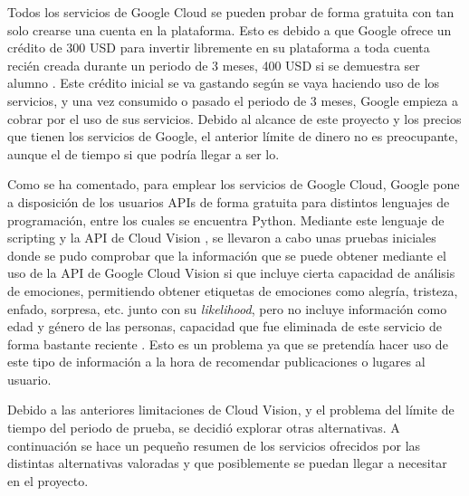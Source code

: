 \begin{itemize}
Todos los servicios de Google Cloud se pueden probar de forma gratuita con tan solo crearse una cuenta en la plataforma. Esto es debido a que Google ofrece un crédito de 300 USD para invertir libremente en su plataforma a toda cuenta recién creada durante un periodo de 3 meses, 400 USD si se demuestra ser alumno \cite{google_cloud}. Este crédito inicial se va gastando según se vaya haciendo uso de los servicios, y una vez consumido o pasado el periodo de 3 meses, Google empieza a cobrar por el uso de sus servicios. Debido al alcance de este proyecto y los precios que tienen los servicios de Google, el anterior límite de dinero no es preocupante, aunque el de tiempo si que podría llegar a ser lo.

Como se ha comentado, para emplear los servicios de Google Cloud, Google pone a disposición de los usuarios APIs de forma gratuita para distintos lenguajes de programación, entre los cuales se encuentra Python. Mediante este lenguaje de scripting y la API de Cloud Vision \cite{api_google_vision}, se llevaron a cabo unas pruebas iniciales donde se pudo comprobar que la información que se puede obtener mediante el uso de la API de Google Cloud Vision si que incluye cierta capacidad de análisis de emociones, permitiendo obtener etiquetas de emociones como alegría, tristeza, enfado, sorpresa, etc. junto con su \textit{likelihood}, pero no incluye información como edad y género de las personas, capacidad que fue eliminada de este servicio de forma bastante reciente \cite{archive_google_gender}. Esto es un problema ya que se pretendía hacer uso de este tipo de información a la hora de recomendar publicaciones o lugares al usuario.

Debido a las anteriores limitaciones de Cloud Vision, y el problema del límite de tiempo del periodo de prueba, se decidió explorar otras alternativas. A continuación se hace un pequeño resumen de los servicios ofrecidos por las distintas alternativas valoradas y que posiblemente se puedan llegar a necesitar en el proyecto.


\end{itemize}
